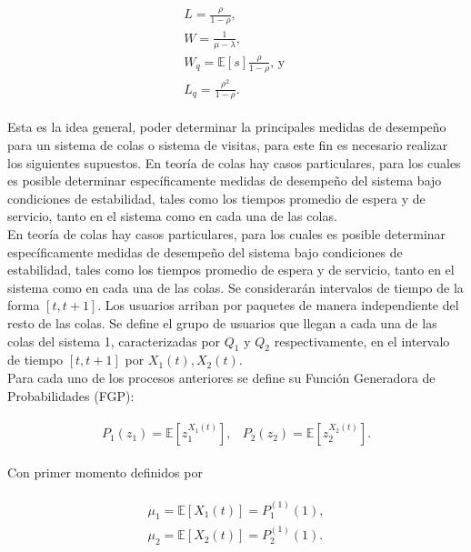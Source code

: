 \documentclass{article}
\newcommand{\esp}{\mathbb{E}}
\numberwithin{equation}{section}
\begin{document}
\begin{eqnarray}
\begin{array}{l}
 L=\frac{\rho}{1-\rho},\\
W=\frac{1}{\mu-\lambda},\\
W_{q}=\esp\left[s\right]\frac{\rho}{1-\rho}\textrm{,  y }\\
L_{q}=\frac{\rho^{2}}{1-\rho}.
\end{array}
\end{eqnarray}

Esta es la idea general, poder determinar la principales medidas de desempe\~no para un sistema de colas o sistema de visitas, para este fin es necesario realizar los siguientes supuestos. En teor\'ia de colas hay casos particulares, para los cuales es posible determinar espec\'ificamente medidas de desempe\~no del sistema bajo condiciones de estabilidad, tales como los tiempos promedio de espera y de servicio, tanto en el sistema como en cada
una de las colas.\\

En teor\'ia de colas hay casos particulares, para los cuales es posible determinar espec\'ificamente medidas de desempe\~no del sistema bajo condiciones de estabilidad, tales como los tiempos promedio de espera y de servicio, tanto en el sistema como en cada una de las colas. Se considerar\'an intervalos de tiempo de la forma $\left[t,t+1\right]$. Los usuarios arriban por paquetes de manera independiente del resto de las colas. Se define el grupo de usuarios que llegan a cada una de las colas del sistema 1, caracterizadas por $Q_{1}$ y $Q_{2}$ respectivamente, en el intervalo de tiempo $\left[t,t+1\right]$ por $X_{1}\left(t\right),X_{2}\left(t\right)$.\\

Para cada uno de los procesos anteriores se define su Funci\'on Generadora de Probabilidades (FGP):

\begin{eqnarray}
\begin{array}{cc}
P_{1}\left(z_{1}\right)=\esp\left[z_{1}^{X_{1}\left(t\right)}\right], & P_{2}\left(z_{2}\right)=\esp\left[z_{2}^{X_{2}\left(t\right)}\right].
\end{array}
\end{eqnarray}

Con primer momento definidos por

\begin{eqnarray}
\begin{array}{l}
\mu_{1}=\esp\left[X_{1}\left(t\right)\right]=P_{1}^{(1)}\left(1\right),\\
\mu_{2}=\esp\left[X_{2}\left(t\right)\right]=P_{2}^{(1)}\left(1\right).
\end{array}
\end{eqnarray}
\end{document}
